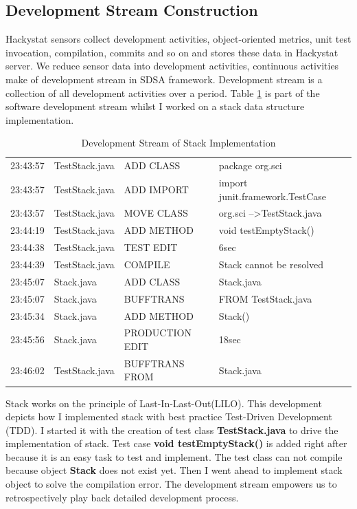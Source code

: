 \subsection{Development Stream Construction}
Hackystat sensors collect development activities, object-oriented metrics,
unit test invocation, compilation, commits and so on and stores these data
in Hackystat server. We reduce sensor data into development activities,
continuous activities make of development stream in SDSA framework.
Development stream is a collection of all development activities over a
period.  Table \ref{tab:stackstream} is part of the software development
stream whilst I worked on a stack data structure implementation.
\begin{table}[!h]
\centering
  \begin{tabular}{|llll|}
  \hline
    23:43:57 & TestStack.java & ADD CLASS & package org.sci \\
    23:43:57 & TestStack.java & ADD IMPORT & import junit.framework.TestCase \\
    23:43:57 & TestStack.java & MOVE CLASS & org.sci --\textgreater TestStack.java \\
    23:44:19 & TestStack.java & ADD METHOD & void testEmptyStack() \\
    23:44:38 & TestStack.java & TEST EDIT & 6sec \\
    23:44:39 & TestStack.java & COMPILE & Stack cannot be resolved \\
    23:45:07 & Stack.java     & ADD CLASS & Stack.java \\
    23:45:07 & Stack.java     & BUFFTRANS & FROM TestStack.java \\
    23:45:34 & Stack.java     & ADD METHOD & Stack() \\
    23:45:56 & Stack.java     & PRODUCTION EDIT & 18sec \\
    23:46:02 & TestStack.java & BUFFTRANS FROM & Stack.java \\
  \hline
  \end{tabular}
  \caption{Development Stream of Stack Implementation}\label{tab:stackstream}  
\end{table}
Stack works on the principle of Last-In-Last-Out(LILO). This development
depicts how I implemented stack with best practice Test-Driven Development
(TDD). I started it with the creation of test class
\textsf{\textbf{TestStack.java}} to drive the implementation of stack. Test
case \textsf{\textbf{void testEmptyStack()}} is added right after because
it is an easy task to test and implement. The test class can not compile
because object \textsf{\textbf{Stack}} does not exist yet. Then I went
ahead to implement stack object to solve the compilation error.  The
development stream empowers us to retrospectively play back detailed
development process.

